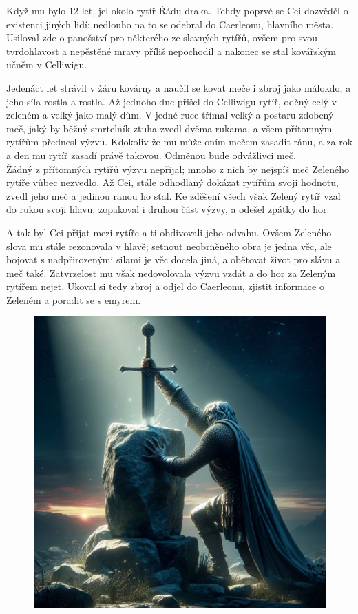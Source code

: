 \documentclass[a4paper,twocolumn,openany,nodeprecatedcode, justified]{dndbook}
\begin{document}
	Když mu bylo 12 let, jel okolo rytíř Řádu draka. Tehdy poprvé se Cei dozvěděl o existenci jiných lidí; nedlouho na to se odebral do Caerleonu, hlavního města. Usiloval zde o panošství pro některého ze slavných rytířů, ovšem pro svou tvrdohlavost a nepěstěné mravy příliš nepochodil a nakonec se stal kovářským učněm v Celliwigu.
	
	Jedenáct let strávil v žáru kovárny a naučil se kovat meče i zbroj jako málokdo, a jeho síla rostla a rostla. Až jednoho dne přišel do Celliwigu rytíř, oděný celý v zeleném a velký jako malý dům. V jedné ruce třímal velký a postaru zdobený meč, jaký by běžný smrtelník ztuha zvedl dvěma rukama, a všem přítomným rytířům přednesl výzvu. Kdokoliv že mu může oním mečem zasadit ránu, a za rok a den mu rytíř zasadí právě takovou. Odměnou bude odvážlivci meč. \\
	
	Žádný z přítomných rytířů výzvu nepřijal; mnoho z nich by nejspíš meč Zeleného rytíře vůbec nezvedlo. Až Cei, stále odhodlaný dokázat rytířům svoji hodnotu, zvedl jeho meč a jedinou ranou ho sťal. Ke zděšení všech však Zelený rytíř vzal do rukou svoji hlavu, zopakoval i druhou část výzvy, a odešel zpátky do hor. 
	
	A tak byl Cei přijat mezi rytíře a ti obdivovali jeho odvahu. Ovšem Zeleného slova mu stále rezonovala v hlavě; setnout neobrněného obra je jedna věc, ale bojovat s nadpřirozenými silami je věc docela jiná, a obětovat život pro slávu a meč také. Zatvrzelost mu však nedovolovala výzvu vzdát a do hor za Zeleným rytířem nejet. Ukoval si tedy zbroj a odjel do Caerleonu, zjistit informace o Zeleném a poradit se s emyrem.
	
	\begin{figure}[t]
		\centering
	\noindent
	\includegraphics[width=\linewidth]{SwordInStone.jpg}
	\end{figure}
	
\end{document}
